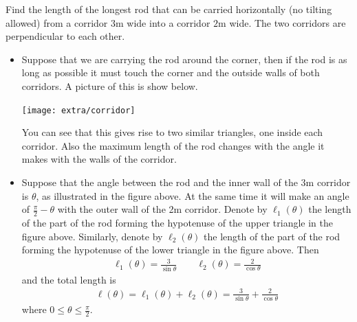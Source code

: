 \begin{eg}\label{APPglobalMaxMinJ}
Find the length of the longest rod that can be carried horizontally (no
tilting allowed) from a corridor $3$m wide into a corridor $2$m wide.
The two corridors are perpendicular to each other.


\soln
\begin{itemize}
 \item Suppose that we are carrying the rod around the corner, then if the rod is as long
as possible it must touch the corner and the outside walls of both corridors. A
picture of this is show below.
\begin{efig}
\begin{center}
   \texttt{[image: extra/corridor]}
\end{center}
\end{efig}
You can see that this gives rise to two similar triangles, one inside each corridor. Also
the maximum length of the rod changes with the angle it makes with the walls of the
corridor.

\item Suppose that the angle between the rod and the inner wall of the $3$m
corridor is $\theta$, as illustrated in the figure above. At the same time it will make an
angle of $\frac{\pi}{2}-\theta$ with the outer wall of the 2m corridor. Denote by
$\ell_1(\theta)$ the length of the part of the rod forming the hypotenuse of the upper
triangle in the figure above. Similarly, denote by $\ell_2(\theta)$ the length of the part
of the rod forming the hypotenuse of the lower triangle in the figure above.  Then
\begin{align*}
\ell_1(\theta) = \frac{3}{\sin\theta}\qquad
\ell_2(\theta) = \frac{2}{\cos\theta}
\end{align*}
and the total length is
\begin{align*}
\ell(\theta) = \ell_1(\theta) +\ell_2(\theta)
             = \frac{3}{\sin\theta}+\frac{2}{\cos\theta}
\end{align*}
where $0 \leq \theta \leq \frac{\pi}{2}$.


\end{itemize}
\end{eg}
